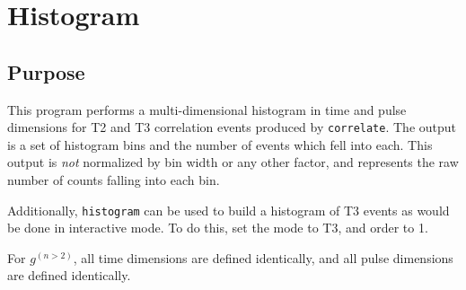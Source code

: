 \documentclass{article}
\newcommand{\correlate}{\texttt{correlate}}
\newcommand{\histogram}{\texttt{histogram}}
\newcommand{\gn}[1]{\ensuremath{g^{(#1)}}}
\begin{document}
\section{Histogram}
\label{sec:histogram}

\subsection{Purpose}
This program performs a multi-dimensional histogram in time and pulse dimensions for T2 and T3 correlation events produced by \correlate. The output is a set of histogram bins and the number of events which fell into each. This output is \textit{not} normalized by bin width or any other factor, and represents the raw number of counts falling into each bin.

Additionally, \histogram{} can be used to build a histogram of T3 events as would be done in interactive mode. To do this, set the mode to T3, and order to 1.

For \gn{n>2}, all time dimensions are defined identically, and all pulse dimensions are defined identically.
\end{document}
